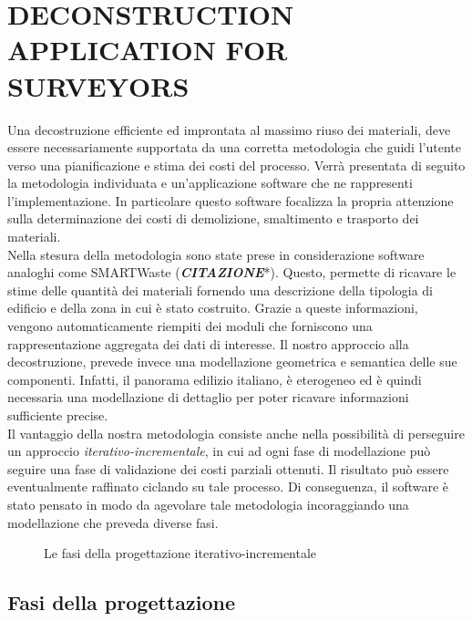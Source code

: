 \section{\uppercase{Deconstruction Application for surveyors}}
\label{sec:application}

\noindent Una decostruzione efficiente ed improntata al massimo riuso dei materiali, deve essere necessariamente supportata da una corretta metodologia che guidi l'utente verso una pianificazione e stima dei costi del processo. Verr\`a presentata di seguito la metodologia individuata e un'applicazione software che ne rappresenti l'implementazione. In particolare questo software focalizza la propria attenzione sulla determinazione dei costi di demolizione, smaltimento e trasporto dei materiali.\\

\noindent Nella stesura della metodologia sono state prese in considerazione software analoghi come SMARTWaste (\textbf{\textit{CITAZIONE}}*). Questo, permette di ricavare le stime delle quantit\`a dei materiali fornendo una descrizione della tipologia di edificio e della zona in cui \`e stato costruito. Grazie a queste informazioni, vengono automaticamente riempiti dei moduli che forniscono una rappresentazione aggregata dei dati di interesse. Il nostro approccio alla decostruzione, prevede invece una modellazione geometrica e semantica delle sue componenti. Infatti, il panorama edilizio italiano, \`e eterogeneo ed \`e quindi necessaria una modellazione di dettaglio per poter ricavare informazioni sufficiente precise.\\

\noindent Il vantaggio della nostra metodologia consiste anche nella possibilit\`a di perseguire un approccio \textit{iterativo-incrementale}, in cui ad ogni fase di modellazione pu\`o seguire una fase di validazione dei costi parziali ottenuti. Il risultato pu\`o essere eventualmente raffinato ciclando su tale processo. Di conseguenza, il software \`e stato pensato in modo da agevolare tale metodologia incoraggiando una modellazione che preveda diverse fasi.\\

\begin{figure}[!h]
  \centering
   {}
  \caption{Le fasi della progettazione iterativo-incrementale}
  \label{fig:example1}
\end{figure}

\subsection{Fasi della progettazione}

